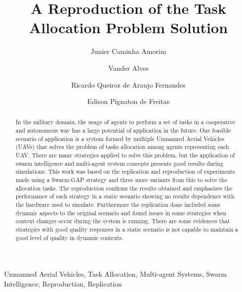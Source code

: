 \documentclass[review]{elsarticle}
\newcommand{\uav}{UAV}
\begin{document}
\begin{frontmatter}
	
\title{A Reproduction of the Task Allocation Problem Solution}

\author[unbaddress]{Junier Caminha Amorim}

\author[unbaddress]{Vander Alves}

\author[brazilianarmyaddress]{Ricardo Queiroz de Araujo Fernandes}

\author[ufrgsaddress]{Edison Pignaton de Freitas}

\address[unbaddress]{Computation Science Department University of Brasilia, Brazil}
\address[ufrgsaddress]{Institute of Informatics Federal University of Rio Grande do Sul, Brazil}
\address[brazilianarmyaddress]{Software Development Center - Brazilian Army, Brazil}

\begin{abstract}
In the military domain, the usage of agents to perform a set of tasks in a cooperative and autonomous way has a large potential of application in the future. One feasible scenario of application is a system formed by multiple Unmanned Aerial Vehicles (UAVs) that solves the problem of tasks allocation among agents representing each \uav. There are many strategies applied to solve this problem, but the application of swarm intelligence and multi-agent system concepts presents good results during simulations. This work was based on the replication and reproduction of experiments made using a Swarm-GAP strategy and three more variants from this to solve the allocation tasks. The reproduction confirms the results obtained and emphasizes the performance of each strategy in a static scenario showing no results dependence with the hardware used to simulate. Furthermore the replication done included some dynamic aspects to the original scenario and found issues in some strategies when context changes occur during the system is running. There are some evidences that strategies with good quality responses in a static scenario is not capable to maintain a good level of quality in dynamic contexts.

\end{abstract}

\begin{keyword}
Unmanned Aerial Vehicles, Task Allocation, Multi-agent Systems, Swarm Intelligence, Reproduction, Replication
\end{keyword}

\end{frontmatter}
\end{document}
